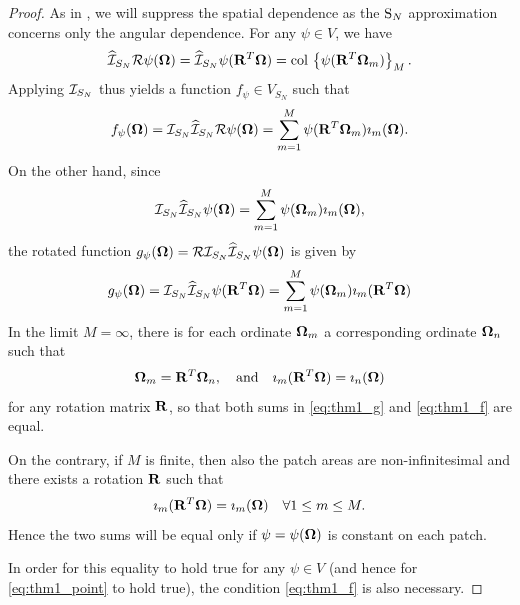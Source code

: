 {\begin{proof}
As in , we will suppress the spatial dependence as the $\text{S}_{N}$ approximation concerns only the angular
dependence. For any $\psi\in V$, we have
\begin{equation*}
	\widehat{{\mathcal{I}}}_{S_N} \mathcal{R}\psi(\mathbf{\Omega}) = \widehat{{\mathcal{I}}}_{S_N} \psi(\mathbf{R}^T\mathbf{\Omega}) =
	\operatorname{col\,}\left\{\psi(\mathbf{R}^T\mathbf{\Omega}_m)\right\}_{M}.
\end{equation*}
Applying ${\mathcal{I}}_{S_N}$ thus yields a function $f_\psi \in V_{S_N}$ such that
\begin{equation}\label{eq:thm1_f}
f_\psi(\mathbf{\Omega}) = {\mathcal{I}}_{S_N}\widehat{{\mathcal{I}}}_{S_N} \mathcal{R}\psi(\mathbf{\Omega}) = \sum_{m=1}^M 
\psi(\mathbf{R}^T\mathbf{\Omega}_m)\imath_m(\mathbf{\Omega}).
\end{equation}
On the other hand, since 
$$
	{\mathcal{I}}_{S_N}\widehat{{\mathcal{I}}}_{S_N}\psi(\mathbf{\Omega}) = \sum_{m=1}^M 
\psi(\mathbf{\Omega}_m)\imath_m(\mathbf{\Omega}),
$$
the rotated function $g_\psi(\mathbf{\Omega}) = \mathcal{R}{\mathcal{I}}_{S_N}\widehat{{\mathcal{I}}}_{S_N}\psi(\mathbf{\Omega})$ is given by
\begin{equation}\label{eq:thm1_g}
g_\psi(\mathbf{\Omega}) = {\mathcal{I}}_{S_N}\widehat{{\mathcal{I}}}_{S_N}\psi(\mathbf{R}^T\mathbf{\Omega}) = \sum_{m=1}^M \psi(\mathbf{\Omega}_m)\imath_m(\mathbf{R}^T\mathbf{\Omega})
\end{equation}
In the limit $M = \infty$, there is for each ordinate $\mathbf{\Omega}_m$ a corresponding ordinate $\mathbf{\Omega}_n$ such that
$$
	\mathbf{\Omega}_m = \mathbf{R}^T \mathbf{\Omega}_n,\quad \mbox{and}\quad \imath_m(\mathbf{R}^T\mathbf{\Omega}) = \imath_n(\mathbf{\Omega})
$$ 
for any rotation matrix $\mathbf{R}$, so that both sums in \eqref{eq:thm1_g} and \eqref{eq:thm1_f} are equal.

On the contrary, if $M$ is finite, then also the patch areas are non-infinitesimal and there exists a rotation
$\mathbf{R}$ such that 
$$
	\imath_m(\mathbf{R}^T\mathbf{\Omega}) = \imath_m(\mathbf{\Omega})\quad \forall 1 \leq m \leq M.
$$
Hence the two sums will be equal only if $\psi = \psi(\mathbf{\Omega})$ is constant on each patch.

In order for this equality to hold true for any $\psi \in V$ (and hence for \eqref{eq:thm1_point} to hold true), the
condition \eqref{eq:thm1_f} is also necessary.
\end{proof}

}

